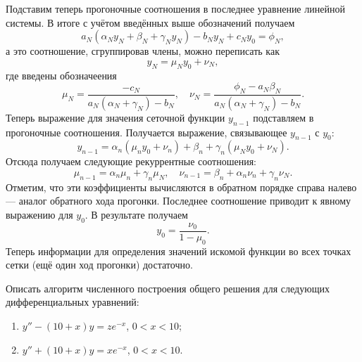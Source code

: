 \documentclass[a4paper]{article}
\begin{document}
\begin{sol}
Подставим теперь прогоночные соотношения в последнее
уравнение линейной системы. В итоге с учётом
введённых выше обозначений получаем
\[
	a_N \left( \alpha_N y_N+\beta_N+\gamma_N
	y_N\right) -b_N y_N+c_N y_0=\phi_N
,\] 
а это соотношение, сгруппировав члены, можно 
переписать как
\[
y_N=\mu_N y_0 +\nu_N
,\] 
где введены обозначеения
\[
	\mu_N= \frac{-c_N}{a_N \left( \alpha_N+ \gamma_N \right) -b_N},\quad \nu_N= \frac{\phi_N -a_N
	\beta_N }{a_N \left(  \alpha_N +\gamma_N\right)-b_N }
.\] 
Теперь выражение для значения сеточной функции
$y_{n-1}$ подставляем в прогоночные соотношения.
Получается выражение,  связывающее $y_{n-1}$ с
$y_0$:
\[
	y_{n-1} =\alpha_n \left( \mu_n y_0 +\nu_n \right) +
	\beta_n +\gamma_n \left( \mu_N y_0 +\nu_N \right) 
.\] 
Отсюда получаем следующие рекуррентные соотношения:
\[
\mu_{n-1}=\alpha_n \mu_n +\gamma_n \mu_N,\quad
\nu_{n-1}=\beta_n+\alpha_n \nu_n +\gamma_n \nu_N
.\] 
Отметим, что эти коэффициенты вычисляются в обратном
порядке справа налево --- аналог обратного хода
прогонки. Последнее соотношение  приводит к явному
выражению для $y_0$. В результате получаем
\[
y_0= \frac{\nu_0}{1-\mu_0}
.\] 
Теперь информации для определения значений искомой функции
во всех точках сетки (ещё один ход прогонки) достаточно.
\end{sol}
\begin{hiProb}[8.1]
Описать алгоритм численного построения общего решения
для следующих дифференциальных уравнений:
\renewcommand{\labelenumi}{\asbuk{enumi})}
\begin{enumerate}
	\item $y''-(10+x)y=z e^{-x}$, $0<x<10$;
	\item $y''+(10+x)y=x e^{-x}$, $0<x<10$.
\end{enumerate}
\end{hiProb}
\end{document}
